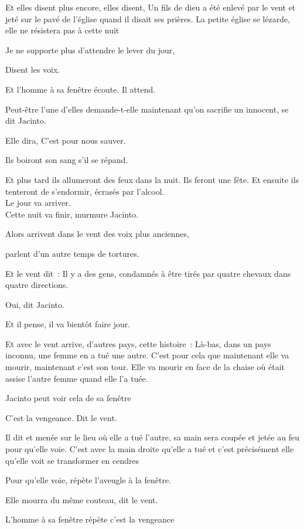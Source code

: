 Et elles disent plus encore, elles disent, Un fils de dieu a été enlevé
par le vent et jeté sur le pavé de l'église quand il disait ses prières.
La petite église se lézarde, elle ne résistera pas à cette nuit

Je ne supporte plus d'attendre le lever du jour,

Disent les voix.

Et l'homme à sa fenêtre écoute. Il attend.

Peut-être l'une d'elles demande-t-elle maintenant qu'on sacrifie un
innocent, se dit Jacinto.

Elle dira, C'est pour nous sauver.

Ils boiront son sang s'il se répand.

Et plus tard ils allumeront des feux dans la nuit. Ils feront une fête.
Et ensuite ils tenteront de s'endormir, écrasés par l'alcool.\\

Le jour va arriver.\\

Cette nuit va finir, murmure Jacinto.

Alors arrivent dans le vent des voix plus anciennes,

parlent d'un autre temps de tortures.

Et le vent dit~: Il y a des gens, condamnés à être tirés par quatre
chevaux dans quatre directions.

Oui, dit Jacinto.

Et il pense, il va bientôt faire jour.

Et avec le vent arrive, d'autres pays, cette histoire~: Là-bas, dans un
pays inconnu, une femme en a tué une autre. C'est pour cela que
maintenant elle va mourir, maintenant c'est son tour. Elle va mourir en
face de la chaise où était assise l'autre femme quand elle l'a tuée.

Jacinto peut voir cela de sa fenêtre

C'est la vengeance. Dit le vent.

Il dit et menée sur le lieu où elle a tué l'autre, sa main sera coupée
et jetée au feu pour qu'elle voie. C'est avec la main droite qu'elle a
tué et c'est précisément elle qu'elle voit se transformer en cendres

Pour qu'elle voie, répète l'aveugle à la fenêtre.

Elle mourra du même couteau, dit le vent.

L'homme à sa fenêtre répète c'est la vengeance

